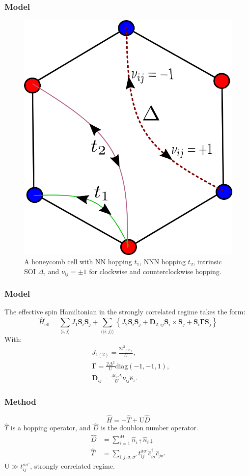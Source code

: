 \documentclass{beamer}
\newcommand{\bs}[1] {\boldsymbol{#1}}
\begin{document}
\begin{frame}
\frametitle{Model}
\begin{figure}[t]
\centering
\includegraphics[width=0.45\columnwidth]{../Paper/kmh.png}
\caption{A honeycomb cell with NN hopping $t_1$, NNN hopping $t_2$, intrinsic SOI $\Delta$, and $\nu_{ij} = \pm 1$ for clockwise and counterclockwise hopping.}
\label{fig1}
\vspace*{-6pt}
\end{figure}
\end{frame}


\begin{frame}
\frametitle{Model}
The effective spin Hamiltonian in the strongly correlated regime takes the form:
\begin{equation}
\hat{H}_{\text{eff}} = \sum_{\langle i,j \rangle} J_{1}\bs{S}_i\bs{S}_j + \sum_{\langle \langle i,j \rangle \rangle} \left\{ J_{2}\bs{S}_i\bs{S}_j + \bs{D}_{2,ij} \bs{S}_i \times \bs{S}_j + \bs{S}_i \bs{\Gamma} \bs{S}_j \right\} \nonumber
\end{equation}
With:
\begin{align*}
&J_{1(2)} = \frac{2t_{1(2)}^2}{U}, \\
&\bs{\Gamma} =\frac{2\Delta^2}{U} \text{diag}(-1,-1,1),\\
&\bs{D}_{ij} = \frac{4 t_2 \Delta}{U}\nu_{ij}  \hat{\mathrm{e}}_z.
\end{align*}

\end{frame}


\begin{frame}
\frametitle{Method}
\begin{equation*}
\hat{H} = -\hat{T} + \text{U}\hat{D}
\end{equation*}
$\hat{T}$ is a hopping operator, and $\hat{D}$ is the doublon number operator.
\begin{align*}
\hat{D} &= \sum_{i=1}^M \hat{n}_{i\uparrow}\hat{n}_{i\downarrow} \\
\hat{T} &= \sum_{i,j, \sigma, \sigma'} t_{ij}^{\sigma \sigma'} \hat{c}_{i \sigma}^\dagger \hat{c}_{j \sigma'}
\end{align*}
$\text{U} \gg t_{ij}^{\sigma \sigma'}$, strongly correlated regime.
\end{frame}
\end{document}
